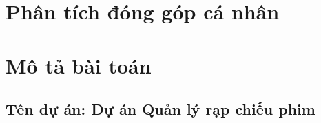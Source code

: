 \documentclass[a4paper, 12pt]{article}
\begin{document}
    \section{Phân tích đóng góp cá nhân}
    \label{sec:analys}
    \clearpage

    \section{Mô tả bài toán}
    \label{sec:decribeProblem}

    \subsection{Tên dự án: Dự án Quản lý rạp chiếu phim}

\end{document}
